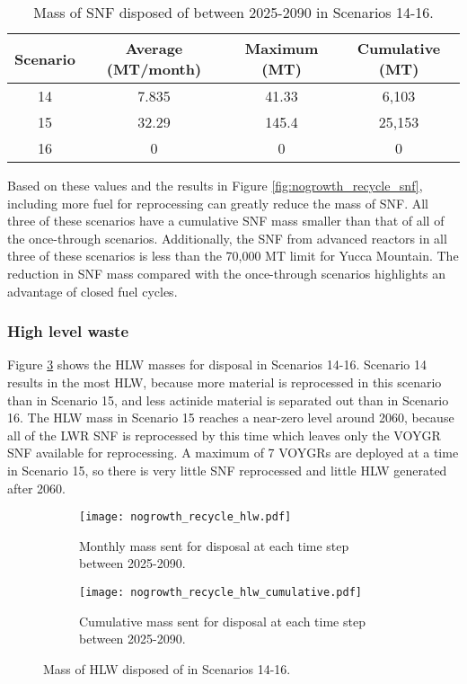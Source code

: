 \begin{table}[h!]
    \centering 
    \caption{Mass of SNF disposed of between 2025-2090 in 
    Scenarios 14-16.}
    \label{tab:s14-16_snf}
    \begin{tabular}{c c c c}
        \hline 
        Scenario & Average (MT/month) & Maximum (MT) & Cumulative (MT) \\
        \hline
        14 & 7.835 & 41.33 & 6,103\\
        15 & 32.29 & 145.4 & 25,153 \\
        16 & 0 & 0 & 0 \\
        \hline
    \end{tabular}
\end{table}

Based on these values and the results in 
Figure \ref{fig:nogrowth_recycle_snf}, including more fuel for 
reprocessing can greatly reduce the mass of \gls{SNF}. All three of 
these scenarios have a cumulative \gls{SNF} mass smaller than 
that of all of the once-through scenarios. Additionally, 
the \gls{SNF} from advanced reactors in all three of these scenarios 
is less than the 70,000 MT limit for Yucca Mountain. The reduction in 
\gls{SNF} mass compared with the once-through scenarios highlights 
an advantage of closed fuel cycles. 

\subsubsection{High level waste}
Figure \ref{fig:nogrowth_recycle_hlw} shows the 
\gls{HLW} masses for disposal in Scenarios 14-16. Scenario 
14 results in the most \gls{HLW}, because more 
material is reprocessed in this scenario than in Scenario 15, 
and less actinide material is separated out than in 
Scenario 16. The \gls{HLW} mass in Scenario 15 reaches a 
near-zero level around 2060, because all of the \gls{LWR} 
\gls{SNF} is reprocessed by this time which leaves only
the VOYGR \gls{SNF} available for reprocessing. A 
maximum of 7 VOYGRs are deployed at a time in Scenario 
15, so there is very little \gls{SNF} reprocessed and 
little \gls{HLW} generated after 2060. 

\begin{figure}[h!]
    \centering
    \begin{subfigure}[b]{0.49\textwidth}
        \centering
        \texttt{[image: nogrowth\_recycle\_hlw.pdf]}
        \caption{Monthly mass sent for disposal 
        at each time step between 2025-2090.}
        \label{fig:nogrowth_recycle_hlw_all}
    \end{subfigure}
    \hfill
    \begin{subfigure}[b]{0.49\textwidth}
        \centering
        \texttt{[image: nogrowth\_recycle\_hlw\_cumulative.pdf]}
        \caption{Cumulative mass sent for disposal 
        at each time step between 2025-2090.}
        \label{fig:nogrowth_recycle_hlw_cumulative}
    \end{subfigure}
       \caption{Mass of \gls{HLW} disposed of in Scenarios 14-16.}
       \label{fig:nogrowth_recycle_hlw}
\end{figure}

